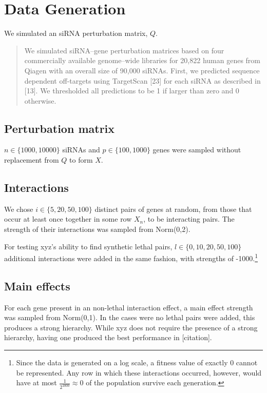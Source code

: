 \documentclass{amsart}
\begin{document}
	
\section{Data Generation}
We simulated an siRNA perturbation matrix, $Q$.


\begin{quotation}
We simulated siRNA–gene perturbation matrices based on four
commercially available genome–wide libraries for 20,822 human genes from Qiagen with an overall size of 90,000 siRNAs. First, we predicted sequence dependent off-targets using TargetScan [23] for each siRNA as described in [13]. We thresholded all predictions to be 1 if
larger than zero and 0 otherwise.
\end{quotation}

\subsection{Perturbation matrix}
$n \in \{1000,10000\}$ siRNAs and $p \in \{100,1000\}$ genes were sampled without replacement from $Q$ to form $X$.

\subsection{Interactions}
We chose $i \in \{5, 20, 50, 100\}$ distinct pairs of genes at random, from those that occur at least once together in some row $X_n$, to be interacting pairs. The strength of their interactions was sampled from Norm(0,2).

For testing xyz's ability to find synthetic lethal pairs, $l \in \{0, 10,20,50,100\}$ additional interactions were added in the same fashion, with strengths of -1000.\footnote{Since the data is generated on a log scale, a fitness value of exactly 0 cannot be represented. Any row in which these interactions occurred, however, would have at most $\frac{1}{2^{1000}} \approx 0$ of the population survive each generation.}


\subsection{Main effects}
For each gene present in an non-lethal interaction effect, a main effect strength was sampled from Norm(0,1). In the cases were no lethal pairs were added, this produces a strong hierarchy. While xyz does not require the presence of a strong hierarchy, having one produced the best performance in [citation].
\end{document}
